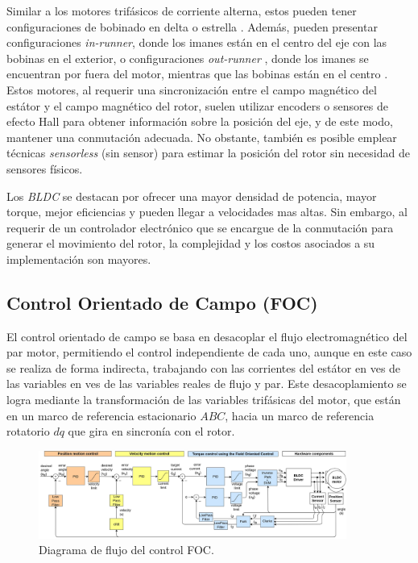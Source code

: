 \documentclass[11pt]{report}
\begin{document}
Similar a los motores trifásicos de corriente alterna, estos pueden tener configuraciones de bobinado en delta o estrella \cite{Millet2022}. Además, pueden presentar configuraciones \textit{in-runner}, donde los imanes están en el centro del eje con las bobinas en el exterior, o configuraciones \textit{out-runner} , donde los imanes se encuentran por fuera del motor, mientras que las bobinas están en el centro \cite{9774372}. Estos motores, al requerir una sincronización entre el campo magnético del estátor y el campo magnético del rotor, suelen utilizar encoders o sensores de efecto Hall para obtener información sobre la posición del eje, y de este modo, mantener una conmutación adecuada. No obstante, también es posible emplear técnicas \textit{sensorless} (sin sensor) para estimar la posición del rotor sin necesidad de sensores físicos. \cite{Gualtieri2018_STEP}

Los \textit{BLDC} se destacan por ofrecer una mayor densidad de potencia, mayor torque, mejor eficiencias y pueden llegar a velocidades mas altas. Sin embargo, al requerir de un controlador electrónico que se encargue de la conmutación para generar el movimiento del rotor, la complejidad y los costos asociados a su implementación son mayores. \cite{AN885}

\newpage
\subsection{Control Orientado de Campo (FOC)}
El control orientado de campo se basa en desacoplar el flujo electromagnético del par motor, permitiendo el control independiente de cada uno, aunque en este caso se realiza de forma indirecta, trabajando con las corrientes del estátor en ves de las variables en ves de las variables reales de flujo y par. Este desacoplamiento se logra mediante la transformación de las variables trifásicas del motor, que están en un marco de referencia estacionario \(ABC\), hacia un marco de referencia rotatorio \(dq\) que gira en sincronía con el rotor. \cite{power_conv_14}

\begin{figure}[ht]
	\centering
	\includegraphics[width=0.9\textwidth]{imagenes/Diagramas/simpleFOC.jpg}
	\caption{Diagrama de flujo del control FOC.\cite{Skuric_SimpleFOC_A_Field_2022}}
	\label{fig:foc_transform}
\end{figure}
\FloatBarrier
\end{document}
